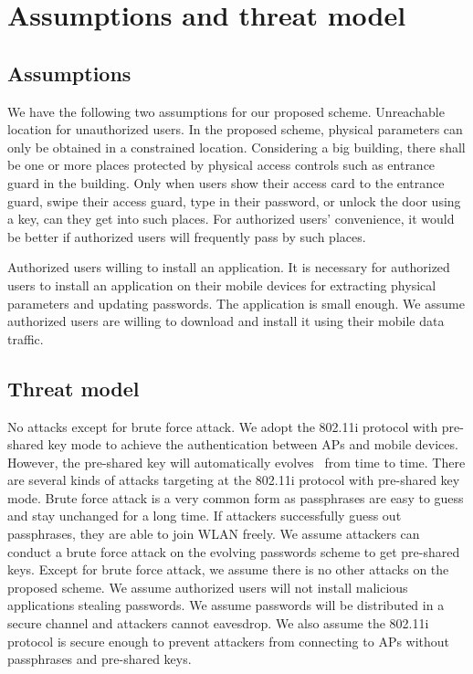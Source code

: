 \section{Assumptions and threat model}
\subsection{Assumptions}
We have the following two assumptions for our proposed scheme. 
Unreachable location for unauthorized users. In the proposed scheme, physical parameters can only be obtained in a constrained location. Considering a big building, there shall be one or more places protected by physical access controls such as entrance guard in the building. Only when users show their access card to the entrance guard, swipe their access guard, type in their password, or unlock the door using a key, can they get into such places. For authorized users’ convenience, it would be better if authorized users will frequently pass by such places.  


Authorized users willing to install an application. It is necessary for authorized users to install an application on their mobile devices for extracting physical parameters and updating passwords. The application is small enough. We assume authorized users are willing to download and install it using their mobile data traffic. 

\subsection{Threat model}
No attacks except for brute force attack. We adopt the 802.11i protocol with pre-shared key mode to achieve the authentication between APs and mobile devices. However, the pre-shared key will automatically evolves~\cite{Pinto2016Hash} from time to time. There are several kinds of attacks targeting at the 802.11i protocol with pre-shared key mode. Brute force attack is a very common form as passphrases are easy to guess and stay unchanged for a long time. If attackers successfully guess out passphrases, they are able to join WLAN freely. We assume attackers can conduct a brute force attack on the evolving passwords scheme to get pre-shared keys. 
Except for brute force attack, we assume there is no other attacks on the proposed scheme. We assume authorized users will not install malicious applications stealing passwords. We assume passwords will be distributed in a secure channel and attackers cannot eavesdrop. We also assume the 802.11i protocol is secure enough to prevent attackers from connecting to APs without passphrases and pre-shared keys.

